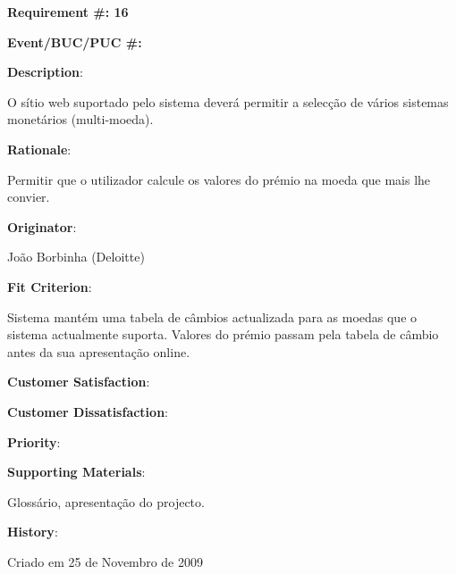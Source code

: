 \pagebreak

\begin{minipage}{0.55\textwidth}
\begin{flushleft}\textbf{Requirement \#: 16}\end{flushleft}
\end{minipage}
\begin{minipage}{0.4\textwidth}
\begin{flushright}\textbf{Event/BUC/PUC \#:}\end{flushright}
\end{minipage}

\begin{description}

\item \textbf{Description}:

O sítio web suportado pelo sistema deverá permitir a selecção de vários sistemas monetários (multi-moeda).\\

\item \textbf{Rationale}:

Permitir que o utilizador calcule os valores do prémio na moeda que mais lhe convier.\\

\item \textbf{Originator}:

João Borbinha (Deloitte)\\

\item \textbf{Fit Criterion}:

Sistema mantém uma tabela de câmbios actualizada para as moedas que o sistema actualmente suporta. Valores do prémio passam pela tabela de câmbio antes da sua apresentação online.\\

\begin{minipage}{0.45\textwidth}
\begin{flushleft}\item \textbf{Customer Satisfaction}:\end{flushleft}
\end{minipage}
\begin{minipage}{0.45\textwidth}
\begin{flushleft}\item \textbf{Customer Dissatisfaction}:\end{flushleft}
\end{minipage}

\item \textbf{Priority}:

\item \textbf{Supporting Materials}:

Glossário, apresentação do projecto.\\

\item \textbf{History}:

Criado em 25 de Novembro de 2009\\
\end{description}

